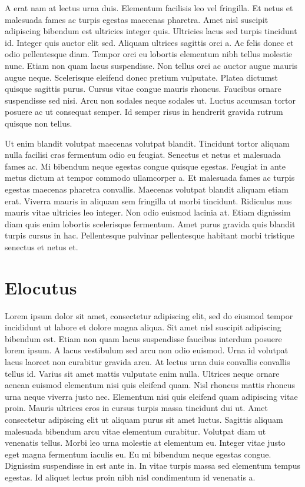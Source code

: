 \documentclass{rust-edu-workshop}
\begin{document}
  A erat nam at lectus urna duis. Elementum facilisis leo
  vel fringilla. Et netus et malesuada fames ac turpis
  egestas maecenas pharetra. Amet nisl suscipit adipiscing
  bibendum est ultricies integer quis. Ultricies lacus sed
  turpis tincidunt id. Integer quis auctor elit sed. Aliquam
  ultrices sagittis orci a. Ac felis donec et odio
  pellentesque diam. Tempor orci eu lobortis elementum nibh
  tellus molestie nunc. Etiam non quam lacus
  suspendisse. Non tellus orci ac auctor augue mauris augue
  neque. Scelerisque eleifend donec pretium
  vulputate. Platea dictumst quisque sagittis purus. Cursus
  vitae congue mauris rhoncus. Faucibus ornare suspendisse
  sed nisi. Arcu non sodales neque sodales ut. Luctus
  accumsan tortor posuere ac ut consequat semper. Id semper
  risus in hendrerit gravida rutrum quisque non tellus.

  Ut enim blandit volutpat maecenas volutpat
  blandit. Tincidunt tortor aliquam nulla facilisi cras
  fermentum odio eu feugiat. Senectus et netus et malesuada
  fames ac. Mi bibendum neque egestas congue quisque
  egestas. Feugiat in ante metus dictum at tempor commodo
  ullamcorper a. Et malesuada fames ac turpis egestas
  maecenas pharetra convallis. Maecenas volutpat blandit
  aliquam etiam erat. Viverra mauris in aliquam sem
  fringilla ut morbi tincidunt. Ridiculus mus mauris vitae
  ultricies leo integer. Non odio euismod lacinia at. Etiam
  dignissim diam quis enim lobortis scelerisque
  fermentum. Amet purus gravida quis blandit turpis cursus
  in hac. Pellentesque pulvinar pellentesque habitant morbi
  tristique senectus et netus et.

\section{Elocutus}

  Lorem ipsum dolor sit amet, consectetur adipiscing elit,
  sed do eiusmod tempor incididunt ut labore et dolore magna
  aliqua. Sit amet nisl suscipit adipiscing bibendum
  est. Etiam non quam lacus suspendisse faucibus interdum
  posuere lorem ipsum. A lacus vestibulum sed arcu non odio
  euismod. Urna id volutpat lacus laoreet non curabitur
  gravida arcu. At lectus urna duis convallis convallis
  tellus id. Varius sit amet mattis vulputate enim
  nulla. Ultrices neque ornare aenean euismod elementum nisi
  quis eleifend quam. Nisl rhoncus mattis rhoncus urna neque
  viverra justo nec. Elementum nisi quis eleifend quam
  adipiscing vitae proin. Mauris ultrices eros in cursus
  turpis massa tincidunt dui ut. Amet consectetur adipiscing
  elit ut aliquam purus sit amet luctus. Sagittis aliquam
  malesuada bibendum arcu vitae elementum
  curabitur. Volutpat diam ut venenatis tellus. Morbi leo
  urna molestie at elementum eu. Integer vitae justo eget
  magna fermentum iaculis eu. Eu mi bibendum neque egestas
  congue. Dignissim suspendisse in est ante in. In vitae
  turpis massa sed elementum tempus egestas. Id aliquet
  lectus proin nibh nisl condimentum id venenatis a.
\end{document}
